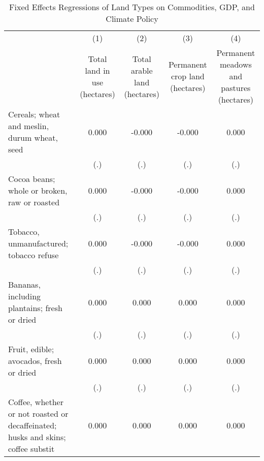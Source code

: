 \begin{table}[htbp]\centering
\def\sym#1{\ifmmode^{#1}\else\(^{#1}\)\fi}
\caption{Fixed Effects Regressions of Land Types on Commodities, GDP, and Climate Policy}
\begin{tabular}{l*{4}{c}}
\toprule
                    &\multicolumn{1}{c}{(1)}&\multicolumn{1}{c}{(2)}&\multicolumn{1}{c}{(3)}&\multicolumn{1}{c}{(4)}\\
                    &\multicolumn{1}{c}{Total land in use (hectares)}&\multicolumn{1}{c}{Total arable land (hectares)}&\multicolumn{1}{c}{Permanent crop land (hectares)}&\multicolumn{1}{c}{Permanent meadows and pastures (hectares)}\\
\midrule
Cereals; wheat and meslin, durum wheat, seed&       0.000         &      -0.000         &      -0.000         &       0.000         \\
                    &         (.)         &         (.)         &         (.)         &         (.)         \\
\addlinespace
Cocoa beans; whole or broken, raw or roasted&       0.000         &      -0.000         &      -0.000         &       0.000         \\
                    &         (.)         &         (.)         &         (.)         &         (.)         \\
\addlinespace
Tobacco, unmanufactured; tobacco refuse&       0.000         &      -0.000         &      -0.000         &       0.000         \\
                    &         (.)         &         (.)         &         (.)         &         (.)         \\
\addlinespace
Bananas, including plantains; fresh or dried&       0.000         &       0.000         &       0.000         &       0.000         \\
                    &         (.)         &         (.)         &         (.)         &         (.)         \\
\addlinespace
Fruit, edible; avocados, fresh or dried&       0.000         &       0.000         &       0.000         &       0.000         \\
                    &         (.)         &         (.)         &         (.)         &         (.)         \\
\addlinespace
Coffee, whether or not roasted or decaffeinated; husks and skins; coffee substit&       0.000         &       0.000         &       0.000         &       0.000         \\

\end{tabular}
\end{table}
